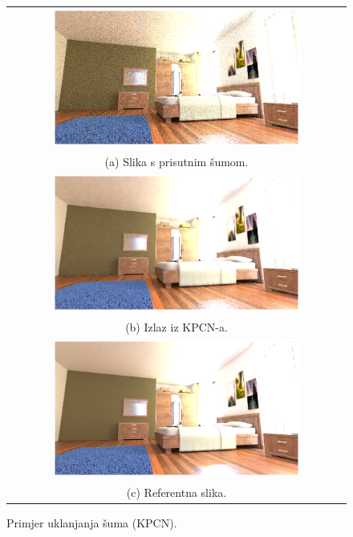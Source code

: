 \documentclass[times, utf8, seminar, numeric]{fer}
\begin{document}
\begin{figure}[H]
  \centering
\begin{tabular}{c}
  \includegraphics[width=0.75\textwidth]{eval4_in.png} \\
  (a) Slika s prisutnim šumom. \\[6pt]
  \includegraphics[width=0.75\textwidth]{eval4_kpcn.png} \\
  (b) Izlaz iz KPCN-a. \\[6pt]
  \includegraphics[width=0.75\textwidth]{eval4_ref.png} \\
  (c) Referentna slika. \\[6pt]
\end{tabular}
\caption{Primjer uklanjanja šuma (KPCN).}
\label{fig:eval4kpcn}
\end{figure}
\end{document}
